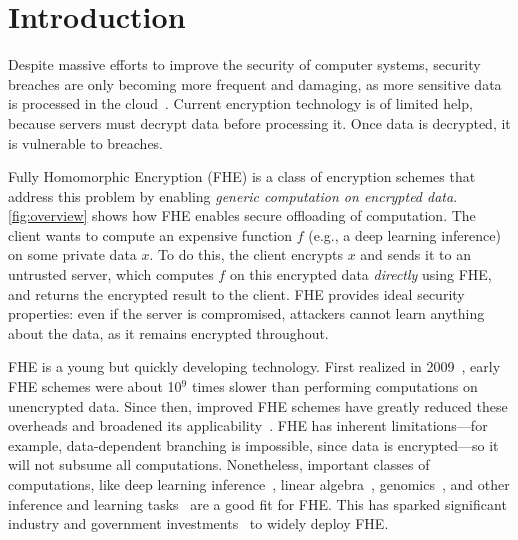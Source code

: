 \chapter{Introduction}
\label{sec:intro}


Despite massive efforts to improve the security of computer systems,
security breaches are only becoming more frequent and damaging,
as more sensitive data is processed in the cloud~\cite{malekos-smith:csis20:hidden-costs-cybercrime,ibm20:breach-cost-report}.
Current encryption technology is of limited help,
because servers must decrypt data before processing it.
Once data is decrypted, it is vulnerable to breaches.

Fully Homomorphic Encryption (FHE) is a class of encryption schemes that
address this problem by enabling \emph{generic computation on encrypted data}.
\autoref{fig:overview} shows how FHE enables secure offloading of computation.
The client wants to compute an expensive function $f$
(e.g., a deep learning inference) on some private data $x$.
To do this, the client encrypts $x$ and sends it to an untrusted server,
which computes $f$ on this encrypted data \emph{directly} using FHE,
and returns the encrypted result to the client.
%
FHE provides ideal security properties: even if the server is compromised,
attackers cannot learn anything about the data,
as it remains encrypted throughout.

FHE is a young but quickly developing technology.
First realized in 2009~\cite{gentry09}, early FHE schemes were
about 10$^9$ times slower than performing computations on unencrypted data.
Since then, improved FHE schemes have greatly reduced these overheads
and broadened its applicability~\cite{albrecht:hesg18:standard,peikert2016decade}.
FHE has inherent limitations---for example, data-dependent branching is impossible,
since data is encrypted---so it will not subsume all computations.
Nonetheless, important classes of computations, like deep learning inference~\cite{cheon:ictaci17:homomorphic,dathathri:pldi19:chet,dathathri:pldi20:eva},
linear algebra~\cite{halevi:crypto14:algorithms}, genomics~\cite{blatt:nas20:secure}, and other inference and learning tasks~\cite{han:aaai19:logistic} are a good fit for FHE.
This has sparked significant industry and government investments~\cite{ibm,intel,dprive}
to widely deploy FHE.

